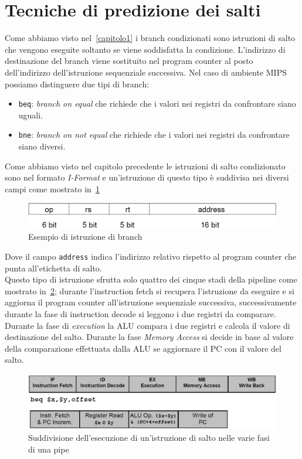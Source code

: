 \section{Tecniche di predizione dei salti}\label{capitolo2}
Come abbiamo visto nel \chaptername\,\ref{capitolo1} i branch condizionati sono istruzioni di salto che vengono eseguite soltanto se viene soddisfatta la condizione. L'indirizzo di destinazione del branch viene sostituito nel program counter al posto dell'indirizzo dell'istruzione sequenziale successiva.
Nel caso di ambiente MIPS possiamo distinguere due tipi di branch:
\begin{itemize}
\item \texttt{beq}: \emph{branch on equal} che richiede che i valori nei registri da confrontare siano uguali.
\item \texttt{bne}: \emph{branch on not equal} che richiede che i valori nei registri da confrontare siano diversi.
\end{itemize}
Come abbiamo visto nel capitolo precedente le istruzioni di salto condizionato sono nel formato \emph{I-Format} e un'istruzione di questo tipo è suddivisa nei diversi campi come mostrato in \figurename\,\ref{fig:branch}
\begin{figure}
\centering
\includegraphics[scale=0.5]{img/condbranch.png}
\caption{Esempio di istruzione di branch}\label{fig:branch}
\end{figure}
Dove il campo \texttt{address} indica l'indirizzo relativo rispetto al program counter che punta all'etichetta di salto.\\
Questo tipo di istruzione sfrutta solo quattro dei cinque stadi della pipeline come mostrato in \figurename\,\ref{fig:branchpipe}; durante l'instruction fetch si recupera l'istruzione da eseguire e si aggiorna il program counter all'istruzione sequenziale successiva, successivamente durante la fase di instruction decode si leggono i due registri da comparare. Durante la fase di \emph{execution} la ALU compara i due registri e calcola il valore di destinazione del salto. Durante la fase \emph{Memory Access} si decide in base al valore della comparazione effettuata dalla ALU se aggiornare il PC con il valore del salto.
\begin{figure}
\centering
\includegraphics[scale=0.5]{img/branchpipe.png}
\caption{Suddivisione dell'esecuzione di un'istruzione di salto nelle varie fasi di una pipe}\label{fig:branchpipe}
\end{figure}
